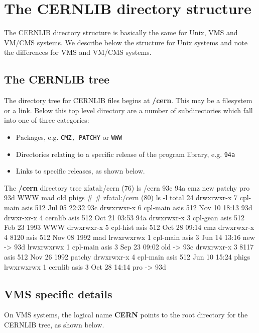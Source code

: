 \chapter{The CERNLIB directory structure}
The CERNLIB directory structure is basically the same
for Unix, VMS and VM/CMS systems. We describe below the
structure for Unix systems and note the differences for
VMS and VM/CMS systems. 

\section{The CERNLIB tree}

The directory tree for CERNLIB files begins at {\bf /cern}.
This may be a filesystem or a link.
Below this top level directory are a number of subdirectories
which fall into one of three categories:

\begin{itemize}
\item
Packages, e.g. {\tt CMZ, PATCHY} or {\tt WWW}
\item
Directories relating to a specific release of the program
library, e.g. {\tt 94a}
\item
Links to specific releases, as shown below.
\end{itemize}

\begin{XMPt}{The {\bf /cern} directory tree}
zfatal:/cern (76) ls /cern
93c     94a     cmz     new     patchy  pro
93d     WWW     mad     old     phigs
#
#
zfatal:/cern (80) ls -l      
total 24
drwxrwxr-x   7 cpl-main asis         512 Jul 05 22:32 93c
drwxrwxr-x   6 cpl-main asis         512 Nov 10 18:13 93d
drwxr-xr-x   4 cernlib  asis         512 Oct 21 03:53 94a
drwxrwxr-x   3 cpl-gean asis         512 Feb 23 1993  WWW
drwxrwxr-x   5 cpl-hist asis         512 Oct 28 09:14 cmz
drwxrwxr-x   4 8120     asis         512 Nov 08 1992  mad
lrwxrwxrwx   1 cpl-main asis           3 Jun 14 13:16 new -> 93d
lrwxrwxrwx   1 cpl-main asis           3 Sep 23 09:02 old -> 93c
drwxrwxr-x   3 8117     asis         512 Nov 26 1992  patchy
drwxrwxr-x   4 cpl-main asis         512 Jun 10 15:24 phigs
lrwxrwxrwx   1 cernlib  asis           3 Oct 28 14:14 pro -> 93d
\end{XMPt}
\section{VMS specific details}
On VMS systems, the logical name {\bf CERN} points to the
root directory for the CERNLIB tree, as shown below.

